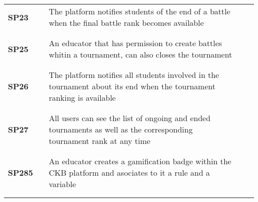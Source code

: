 \begin{longtable}[H]{l l p{8.5cm} l l}
    \textbf{SP23}  & \vline & The platform notifies students of the end of a battle when the final battle rank becomes available                              & \vline &                        \\
                   &        &                                                                                                                                 &        &                        \\\hline & & & & \\
    \textbf{SP25}  & \vline & An educator that has permission to create battles whitin a tournament, can also closes the tournament                           & \vline &                        \\
                   &        &                                                                                                                                 &        &                        \\\hline & & & & \\
    \textbf{SP26}  & \vline & The platform notifies all students involved in the tournament about its end when the tournament ranking is available            & \vline &                        \\
                   &        &                                                                                                                                 &        &                        \\\hline & & & & \\
    \textbf{SP27}  & \vline & All users can see the list of ongoing and ended tournaments as well as the corresponding tournament rank at any time            & \vline &                        \\
                   &        &                                                                                                                                 &        &                        \\\hline & & & & \\
    \textbf{SP285} & \vline & An educator creates a gamification badge within the CKB platform and asociates to it a rule and a variable                      & \vline &                        \\
                   &        &                                                                                                                                 &        &                        \\ \hline & & & & \\

\end{longtable}
